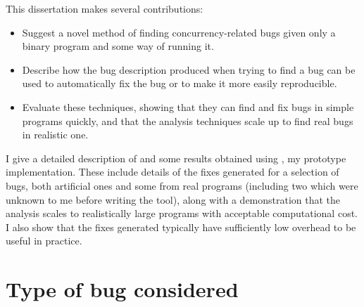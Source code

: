 This dissertation makes several contributions:
\begin{itemize}
\item
  Suggest a novel method of finding concurrency-related bugs given
  only a binary program and some way of running it.
\item
  Describe how the bug description produced when trying to find a bug
  can be used to automatically fix the bug or to make it more easily
  reproducible.
\item
  Evaluate these techniques, showing that they can find and fix bugs
  in simple programs quickly, and that the analysis techniques scale
  up to find real bugs in realistic one.
\end{itemize}
I give a detailed description of {\technique} and some results
obtained using \implementation, my prototype implementation.  These
include details of the fixes generated for a selection of bugs, both
artificial ones and some from real programs (including two which were
unknown to me before writing the tool), along with a demonstration
that the analysis scales to realistically large programs with
acceptable computational cost.  I also show that the fixes generated
typically have sufficiently low overhead to be useful in practice.

\section{Type of bug considered}
\label{sect:types_of_bugs}

